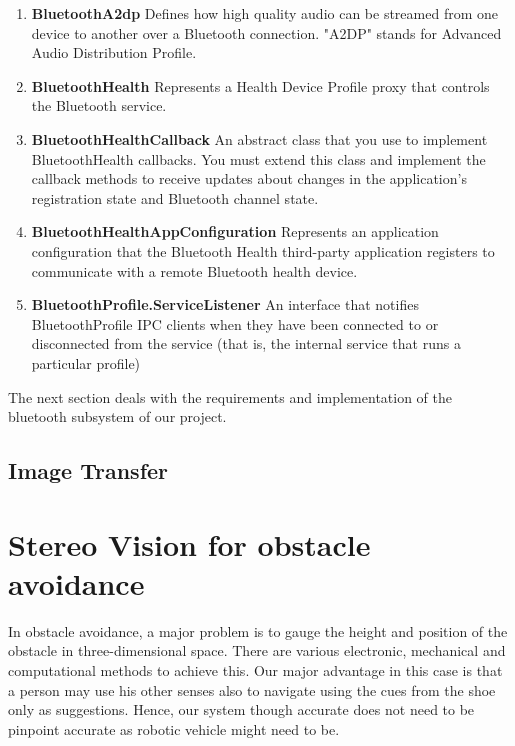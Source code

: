 \documentclass[11pt]{report}
\begin{document}
\begin{enumerate}
\item \textbf{BluetoothA2dp}\newline 
Defines how high quality audio can be streamed from one device to another over a Bluetooth connection. "A2DP" stands for Advanced Audio Distribution Profile.

\item \textbf{BluetoothHealth}\newline 
Represents a Health Device Profile proxy that controls the Bluetooth service.

\item \textbf{BluetoothHealthCallback}\newline 
An abstract class that you use to implement BluetoothHealth callbacks. You must extend this class and implement the callback methods to receive updates about changes in the application’s registration state and Bluetooth channel state.

\item \textbf{BluetoothHealthAppConfiguration}\newline 
Represents an application configuration that the Bluetooth Health third-party application registers to communicate with a remote Bluetooth health device.

\item \textbf{BluetoothProfile.ServiceListener}\newline 
An interface that notifies BluetoothProfile IPC clients when they have been connected to or disconnected from the service (that is, the internal service that runs a particular profile)

\end{enumerate}

The next section deals with the requirements and implementation of the bluetooth subsystem of our project.

\label{imagetransfer}
\subsection{Image Transfer}

\label{stereoalgo}
\section{Stereo Vision for obstacle avoidance}

In obstacle avoidance, a major problem is to gauge the height and position of the obstacle in three-dimensional space. There are various electronic, mechanical and computational methods to achieve this\cite{slam,infrared, thorpe1988vision}. Our major advantage in this case is that a person may use his other senses also to navigate using the cues from the shoe only as suggestions. Hence, our system though accurate does not need to be pinpoint accurate as robotic vehicle might need to be.
\end{document}
